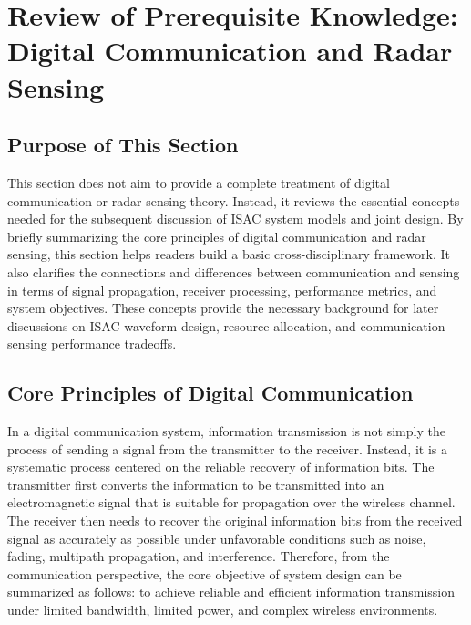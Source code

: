
\section[Prerequisite Knowledge: Digital Communication and Radar Sensing]{Review of Prerequisite Knowledge: Digital Communication and Radar Sensing}
\label{sec:ch1-prerequisites}
 

\subsection{Purpose of This Section}
\label{subsec:ch1-prerequisites-purpose}
 

This section does not aim to provide a complete treatment of digital
communication or radar sensing theory.
Instead, it reviews the essential concepts needed for the subsequent discussion
of ISAC system models and joint design.
By briefly summarizing the core principles of digital communication and radar
sensing, this section helps readers build a basic cross-disciplinary framework.
It also clarifies the connections and differences between communication and
sensing in terms of signal propagation, receiver processing, performance
metrics, and system objectives.
These concepts provide the necessary background for later discussions on ISAC
waveform design, resource allocation, and communication--sensing performance
tradeoffs.
 


 

\subsection{Core Principles of Digital Communication}
\label{subsec:ch1-digital-comm}



In a digital communication system,
information transmission is not simply the process of sending a signal from the transmitter to the receiver.
Instead,
it is a systematic process centered on the reliable recovery of information bits.
The transmitter first converts the information to be transmitted into an electromagnetic signal
that is suitable for propagation over the wireless channel.
The receiver then needs to recover the original information bits from the received signal
as accurately as possible under unfavorable conditions such as noise,
fading,
multipath propagation,
and interference.
Therefore,
from the communication perspective,
the core objective of system design can be summarized as follows:
to achieve reliable and efficient information transmission under limited bandwidth,
limited power,
and complex wireless environments.

